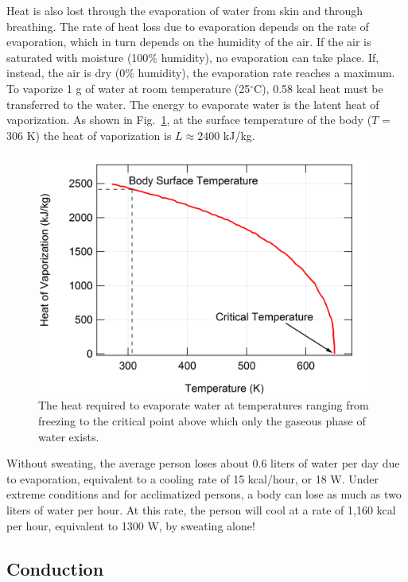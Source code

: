 Heat is also lost through the evaporation of water from skin and through breathing.  The rate of heat loss due to evaporation depends on the rate of evaporation, which in turn depends on the humidity of the air.  If the air is saturated with moisture (100\% humidity), no evaporation can take place.  If, instead, the air is dry (0\% humidity), the evaporation rate reaches a maximum.  
To vaporize 1 g of water at room temperature (25$^{\circ}$C), 0.58 kcal heat must be transferred to the water. The energy to evaporate water is the latent heat of vaporization. As shown in Fig.~\ref{Fig4-2}, at the surface temperature of the body ($T$ = 306 K) the heat of vaporization is $L \approx 2400$ kJ/kg.
\begin{figure}[h]
	\centering
	\includegraphics[width=\textwidth]{./figures/Topic4/Fig4-2.png}
	\caption{The heat required to evaporate water at temperatures ranging from freezing to the critical point above which only the gaseous phase of water exists.}
	\label{Fig4-2}
\end{figure}
Without sweating, the average person loses about 0.6 liters of water per day due to evaporation, equivalent to a cooling rate of 15 kcal/hour, or 18 W.  Under extreme conditions and for acclimatized persons, a body can lose as much as two liters of water per hour.  At this rate, the person will cool at a rate of 1,160 kcal per hour, equivalent to 1300 W, by sweating alone!

\subsection{Conduction}

